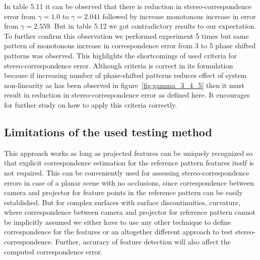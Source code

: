 In table 5.11 it can be observed that there is reduction in stereo-correspondence error from $\gamma=1.0$ to $\gamma=2.041$ followed by increase monotonous increase in error from $\gamma=2.559$. But in table 5.12 we got contradictory results to our expectation. To further confirm this observation we performed experiment 5 times but same pattern of monotonous increase in correspondence error from 3 to 5 phase shifted patterns was observed. This highlights the shortcomings of used criteria for stereo-correspondence error. Although criteria is correct in its formulation because if increasing number of phase-shifted patterns reduces effect of system non-linearity as has been observed in figure~\ref{fig:gamma_3_4_5} then it must result in reduction in stereo-correspondence error as defined here. It encourages for further study on how to apply this criteria correctly. 

\subsection{Limitations of the used testing method}
This approach works as long as projected features can be uniquely recognized so that explicit correspondence estimation for the reference pattern features itself is not required. This can be conveniently used for assessing stereo-correspondence errors in case of a planar scene with no occlusions, since correspondence between camera and projector for feature points in the reference pattern can be easily established. But for complex surfaces with surface discontinuities, curvature, where correspondence between camera and projector for reference pattern cannot be implicitly assumed we either have to use any other technique to define correspondence for the features or an altogether different approach to test stereo-correspondence. Further, accuracy of feature detection will also affect the computed correspondence error.


